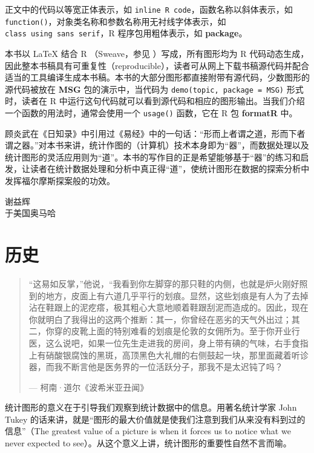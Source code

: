 \documentclass[
  b5paper,
  UTF8,twoside]{book}
\begin{document}
正文中的代码以等宽正体表示，如 \texttt{inline\ R\ code}，函数名称以斜体表示，如 \texttt{function()}，对象类名称和参数名称用无衬线字体表示，如 \texttt{class\ using\ sans\ serif}，R 程序包用粗体表示，如 \textbf{package}。

本书以 LaTeX 结合 R （Sweave，参见 \citet{Leisch02} ）写成，所有图形均为 R 代码动态生成，因此整本书稿具有可重复性（reproducible），读者可从网上下载书稿源代码并配合适当的工具编译生成本书稿。本书的大部分图形都直接附带有源代码，少数图形的源代码被放在 \textbf{MSG} 包的演示中，当代码为 \texttt{demo(\textquotesingle{}topic\textquotesingle{},\ package\ =\ \textquotesingle{}MSG\textquotesingle{})} 形式时，读者在 R 中运行这句代码就可以看到源代码和相应的图形输出。当我们介绍一个函数的用法时，通常会使用一个 \texttt{usage()} 函数，它在 R 包 \textbf{formatR} 中。

顾炎武在《日知录》中引用过《易经》中的一句话：``形而上者谓之道，形而下者谓之器。''对本书来讲，统计作图的（计算机）技术本身即为``器''，而数据处理以及统计图形的灵活应用则为``道''。本书的写作目的正是希望能够基于``器''的练习和启发，让读者在统计数据处理和分析中真正得``道''，使统计图形在数据的探索分析中发挥福尔摩斯探案般的功效。

\begin{flushright}
谢益辉\\
于美国奥马哈
\end{flushright}

\chapter{历史}\label{cha:history}

\begin{quote}
``这易如反掌，''他说，``我看到你左脚穿的那只鞋的内侧，也就是炉火刚好照到的地方，皮面上有六道几乎平行的划痕。显然，这些划痕是有人为了去掉沾在鞋跟上的泥疙瘩，极其粗心大意地顺着鞋跟刮泥而造成的。因此，现在你就明白了我得出的这两个推断：其一，你曾经在恶劣的天气外出过；其二，你穿的皮靴上面的特别难看的划痕是伦敦的女佣所为。至于你开业行医，这么说吧，如果一位先生走进我的房间，身上带有碘的气味，右手食指上有硝酸银腐蚀的黑斑，高顶黑色大礼帽的右侧鼓起一块，那里面藏着听诊器，而我不断言他是医务界的一位活跃分子，那我不是太迟钝了吗？

\hspace*{\fill} --- 柯南·道尔《波希米亚丑闻》
\end{quote}

统计图形的意义在于引导我们观察到统计数据中的信息。用著名统计学家 John Tukey 的话来讲，就是``图形的最大价值就是使我们注意到我们从来没有料到过的信息''（The greatest value of a picture is when it forces us to notice what we never expected to see）。从这个意义上讲，统计图形的重要性自然不言而喻。
\end{document}
